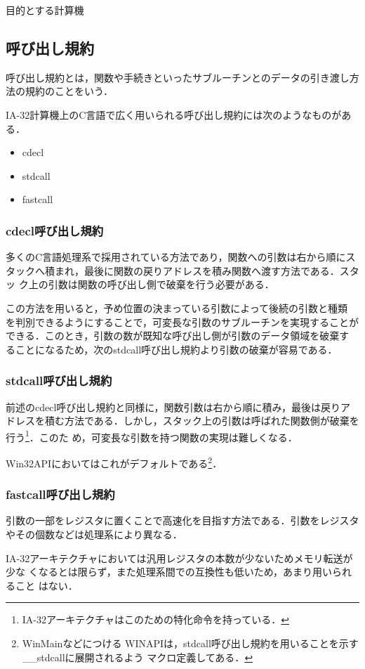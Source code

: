\documentclass[a4paper,titlepage,report]{jsbook}
\begin{document}
\begin{resbonsiblesection}{目的とする計算機}{\kobori}
\subsection{呼び出し規約}\label{ssc:calling-convention}
呼び出し規約とは，関数や手続きといったサブルーチンとのデータの引き渡し方
法の規約のことをいう．

IA-32計算機上のC言語で広く用いられる呼び出し規約には次のようなものがある．
\begin{itemize}
 \item cdecl
 \item stdcall
 \item fastcall
\end{itemize}

\subsubsection{cdecl呼び出し規約}
多くのC言語処理系で採用されている方法であり，関数への引数は右から順にス
タックへ積まれ，最後に関数の戻りアドレスを積み関数へ渡す方法である．スタッ
ク上の引数は関数の呼び出し側で破棄を行う必要がある．

この方法を用いると，予め位置の決まっている引数によって後続の引数と種類
を判別できるようにすることで，可変長な引数のサブルーチンを実現することが
できる．このとき，引数の数が既知な呼び出し側が引数のデータ領域を破棄す
ることになるため，次のstdcall呼び出し規約より引数の破棄が容易である．

\subsubsection{stdcall呼び出し規約}
前述のcdecl呼び出し規約と同様に，関数引数は右から順に積み，最後は戻りア
ドレスを積む方法である．しかし，スタック上の引数は呼ばれた関数側が破棄を
行う\footnote{IA-32アーキテクチャはこのための特化命令を持っている．}．このた
め，可変長な引数を持つ関数の実現は難しくなる．

Win32APIにおいてはこれがデフォルトである\footnote{WinMainなどにつける
WINAPIは，stdcall呼び出し規約を用いることを示す\_\_stdcallに展開されるよう
マクロ定義してある．}．

\subsubsection{fastcall呼び出し規約}
引数の一部をレジスタに置くことで高速化を目指す方法である．引数をレジスタ
やその個数などは処理系により異なる．

IA-32アーキテクチャにおいては汎用レジスタの本数が少ないためメモリ転送が少な
くなるとは限らず，また処理系間での互換性も低いため，あまり用いられること
はない．


\end{resbonsiblesection}
\end{document}
